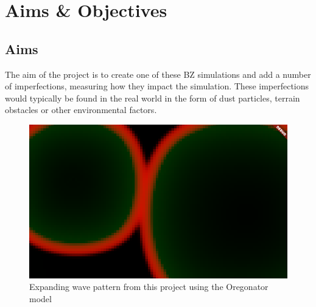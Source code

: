 


\section{Aims \& Objectives}
\subsection{Aims}

The aim of the project is to create one of these BZ simulations and add a number of imperfections, measuring how they impact the simulation. These imperfections would typically be found in the real world in the form of dust particles, terrain obstacles or other environmental factors.
\begin{figure}
    \centering
    \includegraphics[width=0.75\linewidth]{original_proposal/Screenshot 2023-10-24 at 08.09.52.png}
    \caption{Expanding wave pattern from this project using the Oregonator model}
    \label{fig:first-waves}
\end{figure}

